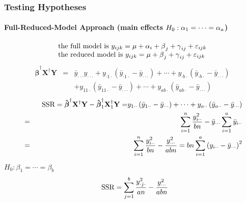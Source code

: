 \documentclass{article}
\begin{document}
\bigskip

\subsubsection{Testing Hypotheses}

\paragraph{Full-Reduced-Model Approach (main effects $H_{0}:\protect\alpha %
_{1}=\cdots =\protect\alpha _{a}$)}

\begin{equation*}
\begin{tabular}{l}
the full model is $y_{ijk}=\mu +\alpha _{i}+\beta _{j}+\gamma
_{ij}+\varepsilon _{ijk}$ \\ 
the reduced model is $y_{ijk}=\mu +\beta _{j}+\gamma _{ij}+\varepsilon
_{ijk} $%
\end{tabular}%
\end{equation*}%
\begin{eqnarray*}
\mathbf{\hat{\beta}}^{\dagger }\mathbf{X}^{\dagger }\mathbf{Y} &=&\bar{y}%
_{\cdot \cdot \cdot }y_{\cdot \cdot \cdot }+y_{\cdot 1\cdot }\left( \bar{y}%
_{\cdot 1\cdot }-\bar{y}_{\cdot \cdot \cdot }\right) +\cdots +y_{\cdot
b\cdot }\left( \bar{y}_{\cdot b\cdot }-\bar{y}_{\cdot \cdot \cdot }\right) \\
&&+y_{11\cdot }\left( \bar{y}_{11\cdot }-\bar{y}_{\cdot \cdot \cdot }\right)
+\cdots +y_{ab\cdot }\left( \bar{y}_{ab\cdot }-\bar{y}_{\cdot \cdot \cdot
}\right)
\end{eqnarray*}%
\begin{eqnarray*}
&\therefore &\text{SSR}=\mathbf{\hat{\beta}}^{\dagger }\mathbf{X}^{\dagger }%
\mathbf{Y}-\mathbf{\hat{\beta}}_{1}^{\dagger }\mathbf{X}_{1}^{\dagger }%
\mathbf{Y=}y_{1\cdot \cdot }\left( \bar{y}_{1\cdot \cdot }-\bar{y}_{\cdot
\cdot \cdot }\right) +\cdots +y_{a\cdot \cdot }\left( \bar{y}_{a\cdot \cdot
}-\bar{y}_{\cdot \cdot \cdot }\right) \\
&=&\sum\limits_{i=1}^{n}\frac{y_{i\cdot \cdot }^{2}}{bn}-\bar{y}_{\cdot
\cdot \cdot }\sum\limits_{i=1}^{a}\bar{y}_{i\cdot \cdot } \\
&=&\sum\limits_{i=1}^{n}\frac{y_{i\cdot \cdot }^{2}}{bn}-\frac{y_{\cdot
\cdot \cdot }^{2}}{abn}=bn\sum\limits_{i=1}^{a}\left( y_{i\cdot \cdot }-\bar{%
y}_{\cdot \cdot \cdot }\right) ^{2}
\end{eqnarray*}

$H_{0}:\beta _{1}=\cdots =\beta _{b}$%
\begin{equation*}
\text{SSR}=\sum\limits_{j=1}^{b}\frac{y_{\cdot j\cdot }^{2}}{an}-\frac{%
y_{\cdot \cdot \cdot }^{2}}{abn}
\end{equation*}
\end{document}
